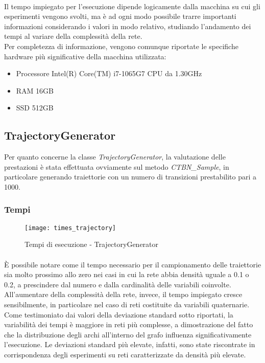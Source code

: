   \paragraph{}
  Il tempo impiegato per l'esecuzione dipende logicamente dalla macchina su cui gli esperimenti
  vengono svolti, ma è ad ogni modo possibile trarre importanti informazioni considerando i valori
  in modo relativo, studiando l'andamento dei tempi al variare della complessità della rete.\\
  Per completezza di informazione, vengono comunque riportate le specifiche hardware più significative della macchina utilizzata:
  \begin{itemize}
    \item Processore Intel(R) Core(TM) i7-1065G7 CPU da 1.30GHz
    \item RAM 16GB
    \item SSD 512GB 
  \end{itemize}

  \subsection{TrajectoryGenerator}
  Per quanto concerne la classe \textit{TrajectoryGenerator}, la valutazione delle prestazioni
  è stata effettuata ovviamente sul metodo \textit{CTBN\_Sample}, in particolare generando traiettorie
  con un numero di transizioni prestabilito pari a 1000.

  \subsubsection{Tempi}
  \begin{figure}[H]
    \texttt{[image: times\_trajectory]}
    \centering
    \caption{Tempi di esecuzione - TrajectoryGenerator}
  \end{figure}

  \paragraph{}
  È possibile notare come il tempo necessario per il campionamento delle traiettorie sia molto
  prossimo allo zero nei casi in cui la rete abbia densità uguale a 0.1 o 0.2, a prescindere dal numero
  e dalla cardinalità delle variabili coinvolte. All'aumentare della complessità della rete, invece,
  il tempo impiegato cresce sensibilmente, in particolare nel caso di reti costituite da
  variabili quaternarie.\\
  Come testimoniato dai valori della deviazione standard sotto riportati, la variabilità dei tempi 
  è maggiore in reti più complesse, a dimostrazione del fatto che la distribuzione degli archi 
  all'interno del grafo influenza significativamente l'esecuzione. Le deviazioni standard più 
  elevate, infatti, sono state riscontrate in corrispondenza degli esperimenti su reti caratterizzate
  da densità più elevate.

